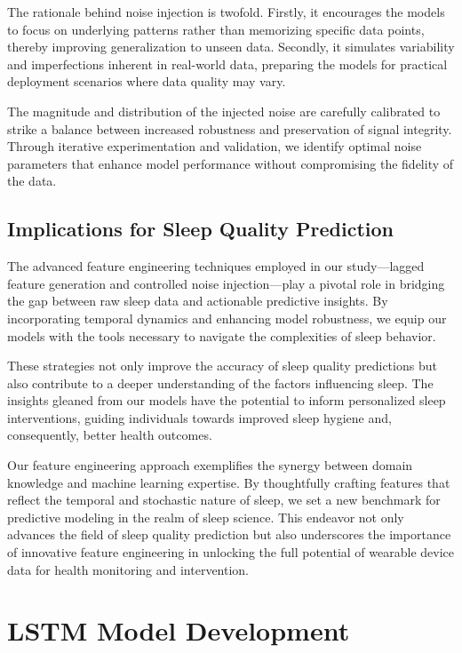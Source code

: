 \documentclass[10pt]{extarticle}
\begin{document}
The rationale behind noise injection is twofold. Firstly, it encourages the models to focus on underlying patterns rather than memorizing specific data points, thereby improving generalization to unseen data. Secondly, it simulates variability and imperfections inherent in real-world data, preparing the models for practical deployment scenarios where data quality may vary.

The magnitude and distribution of the injected noise are carefully calibrated to strike a balance between increased robustness and preservation of signal integrity. Through iterative experimentation and validation, we identify optimal noise parameters that enhance model performance without compromising the fidelity of the data.

\subsection{Implications for Sleep Quality Prediction}

The advanced feature engineering techniques employed in our study—lagged feature generation and controlled noise injection—play a pivotal role in bridging the gap between raw sleep data and actionable predictive insights. By incorporating temporal dynamics and enhancing model robustness, we equip our models with the tools necessary to navigate the complexities of sleep behavior.

These strategies not only improve the accuracy of sleep quality predictions but also contribute to a deeper understanding of the factors influencing sleep. The insights gleaned from our models have the potential to inform personalized sleep interventions, guiding individuals towards improved sleep hygiene and, consequently, better health outcomes.

Our feature engineering approach exemplifies the synergy between domain knowledge and machine learning expertise. By thoughtfully crafting features that reflect the temporal and stochastic nature of sleep, we set a new benchmark for predictive modeling in the realm of sleep science. This endeavor not only advances the field of sleep quality prediction but also underscores the importance of innovative feature engineering in unlocking the full potential of wearable device data for health monitoring and intervention.

\section{LSTM Model Development}
\end{document}
